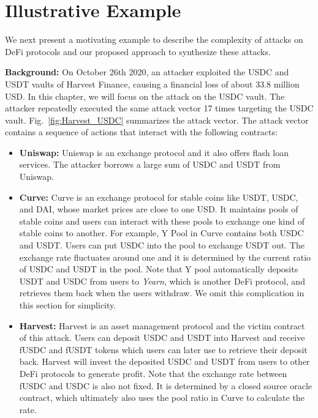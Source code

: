 \chapter{Illustrative Example}
\label{sec:example}

We next present a motivating example to describe the complexity of attacks on
DeFi protocols and our proposed approach to synthesize these attacks.

\noindent \textbf{Background:} On October 26th 2020, an attacker exploited the
USDC and USDT vaults of Harvest Finance, causing a financial loss of about
$33.8$ million USD. In this chapter, we will focus on the attack on the USDC vault.
The attacker repeatedly executed the same attack vector 17 times targeting the USDC vault.
Fig.~\ref{fig:Harvest_USDC} summarizes the attack vector.
The attack vector contains a sequence of actions that interact with the following contracts:
\begin{itemize}
    \item \textbf{Uniswap:} Uniswap is an exchange protocol and it also offers flash loan services. The attacker borrows a large sum of USDC and USDT from Uniswap.

    \item \textbf{Curve:} Curve is an exchange protocol for stable coins like
        USDT, USDC, and DAI, whose market prices are close to one USD. It
        maintains pools of stable coins and users can interact with these pools
        to exchange one kind of stable coins to another. For example, Y Pool in
        Curve contains both USDC and USDT. Users can put USDC into the pool to
        exchange USDT out. The exchange rate fluctuates around one and it is
        determined by the current ratio of USDC and USDT in the pool. Note that
        Y pool automatically deposits USDT and USDC from users to \emph{Yearn},
        which is another DeFi protocol, and retrieves them back when the users
        withdraw. We omit this complication in this section for simplicity.

    \item \textbf{Harvest:} Harvest is an asset management protocol and the
        victim contract of this attack. Users can deposit USDC and USDT into
        Harvest and receive fUSDC and fUSDT tokens which users can later use to
        retrieve their deposit back. Harvest will invest the deposited USDC and
        USDT from users to other DeFi protocols to generate profit. Note that
        the exchange rate between fUSDC and USDC is also not fixed. It is
        determined by a closed source oracle contract, which ultimately
        also uses the pool ratio in Curve to calculate the rate.
\end{itemize}

